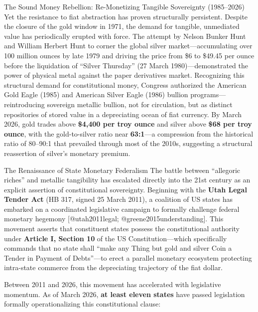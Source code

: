 \documentclass[
  ignorenonframetext,
]{beamer}
\author{\texorpdfstring{}{}}
\date{}
\begin{document}
\begin{frame}{The Sound Money Rebellion: Re-Monetizing Tangible
Sovereignty (1985--2026)}
\protect{}\label{the-sound-money-rebellion-re-monetizing-tangible-sovereignty-19852026}
Yet the resistance to fiat abstraction has proven structurally
persistent. Despite the closure of the gold window in 1971, the demand
for tangible, unmediated value has periodically erupted with force. The
attempt by Nelson Bunker Hunt and William Herbert Hunt to corner the
global silver market---accumulating over 100 million ounces by late 1979
and driving the price from \$6 to \$49.45 per ounce before the
liquidation of ``Silver Thursday'' (27 March 1980)---demonstrated the
power of physical metal against the paper derivatives market.
Recognizing this structural demand for constitutional money, Congress
authorized the American Gold Eagle (1985) and American Silver Eagle
(1986) bullion programs---reintroducing sovereign metallic bullion, not
for circulation, but as distinct repositories of stored value in a
depreciating ocean of fiat currency. By March 2026, gold trades above
\textbf{\$4,400 per troy ounce} and silver above \textbf{\$68 per troy
ounce}, with the gold-to-silver ratio near \textbf{63:1}---a compression
from the historical ratio of 80--90:1 that prevailed through most of the
2010s, suggesting a structural reassertion of silver's monetary premium.

\begin{block}{The Renaissance of State Monetary Federalism}
\protect{}\label{the-renaissance-of-state-monetary-federalism}
The battle between ``allegoric riches'' and metallic tangibility has
escalated directly into the 21st century as an explicit assertion of
constitutional sovereignty. Beginning with the \textbf{Utah Legal Tender
Act} (HB 317, signed 25 March 2011), a coalition of US states has
embarked on a coordinated legislative campaign to formally challenge
federal monetary hegemony {[}@utah2011legal;
@greene2015understanding{]}. This movement asserts that constituent
states possess the constitutional authority under \textbf{Article I,
Section 10} of the US Constitution---which specifically commands that no
state shall ``make any Thing but gold and silver Coin a Tender in
Payment of Debts''---to erect a parallel monetary ecosystem protecting
intra-state commerce from the depreciating trajectory of the fiat
dollar.

Between 2011 and 2026, this movement has accelerated with legislative
momentum. As of March 2026, \textbf{at least eleven states} have passed
legislation formally operationalizing this constitutional clause:


\end{block}
\end{frame}
\end{document}
